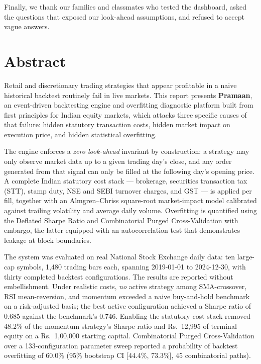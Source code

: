\documentclass[12pt,a4paper,oneside]{report}
\newcommand{\rupee}{Rs.\ }
\begin{document}
Finally, we thank our families and classmates who tested the dashboard, asked the
questions that exposed our look-ahead assumptions, and refused to accept vague
answers.

\chapter*{Abstract}
\thispagestyle{plain}

\vspace{0.5cm}

Retail and discretionary trading strategies that appear profitable in a naive
historical backtest routinely fail in live markets. This report presents
\textbf{Pramaan}, an event-driven backtesting engine and overfitting diagnostic
platform built from first principles for Indian equity markets, which attacks
three specific causes of that failure: hidden statutory transaction costs,
hidden market impact on execution price, and hidden statistical overfitting.

The engine enforces a \emph{zero look-ahead} invariant by construction: a
strategy may only observe market data up to a given trading day's close, and any
order generated from that signal can only be filled at the following day's
opening price. A complete Indian statutory cost stack --- brokerage, securities
transaction tax (STT), stamp duty, NSE and SEBI turnover charges, and GST --- is
applied per fill, together with an Almgren--Chriss square-root market-impact
model calibrated against trailing volatility and average daily volume. Overfitting
is quantified using the Deflated Sharpe Ratio and Combinatorial Purged
Cross-Validation with embargo, the latter equipped with an autocorrelation test
that demonstrates leakage at block boundaries.

The system was evaluated on real National Stock Exchange daily data: ten large-cap
symbols, 1{,}480 trading bars each, spanning 2019-01-01 to 2024-12-30, with
thirty completed backtest configurations. The results are reported without
embellishment. Under realistic costs, \emph{no} active strategy among
SMA-crossover, RSI mean-reversion, and momentum exceeded a naive buy-and-hold
benchmark on a risk-adjusted basis; the best active configuration achieved a
Sharpe ratio of 0.685 against the benchmark's 0.746. Enabling the statutory cost
stack removed 48.2\% of the momentum strategy's Sharpe ratio and
\rupee{}12{,}995 of terminal equity on a \rupee{}1{,}00{,}000 starting capital.
Combinatorial Purged Cross-Validation over a 133-configuration parameter sweep
reported a probability of backtest overfitting of 60.0\% (95\% bootstrap CI
[44.4\%, 73.3\%], 45 combinatorial paths).
\end{document}
